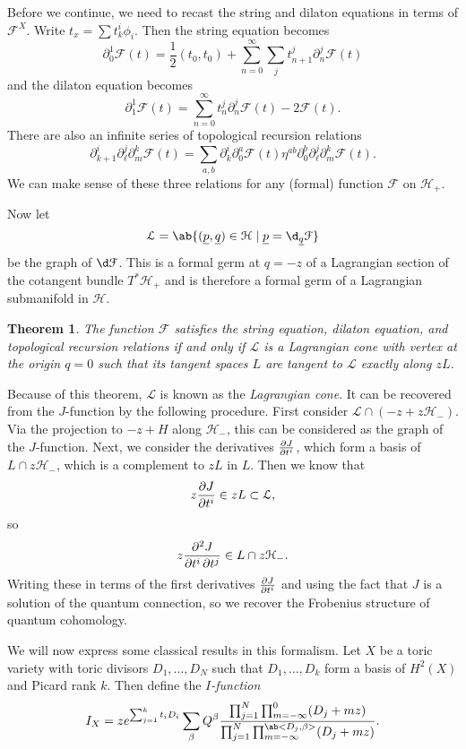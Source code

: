 \documentclass[leqno, openany]{memoir}
\newtheorem{thm}{Theorem}[section]
\theoremstyle{definition}
\theoremstyle{remark}
\theoremstyle{plain}
\theoremstyle{definition}
\theoremstyle{remark}
\newcommand{\mc}[1]{\mathcal{#1}}
\newcommand{\ul}[1]{\underline{#1}}
\begin{document}
Before we continue, we need to recast the string and dilaton equations in terms of $\mc{F}^X$. Write $t_x = \sum t_k^i \phi_i$. Then the string equation becomes
\[ \partial_0^1 \mc{F}(t) = \frac{1}{2} (t_0, t_0) + \sum_{n=0}^{\infty} \sum_{j} t_{n+1}^{j} \partial_n^{j} \mc{F}(t) \]
and the dilaton equation becomes
\[ \partial_1^1 \mc{F}(t) = \sum_{n=0}^{\infty} t_n^j \partial_n^j \mc{F}(t) - 2 \mc{F}(t). \]
There are also an infinite series of topological recursion relations
\[ \partial_{k+1}^i \partial_{\ell}^j \partial_{m}^k \mc{F}(t) = \sum_{a,b} \partial_k^i \partial_0^a \mc{F}(t) \eta^{ab} \partial_0^b \partial_{\ell}^j \partial_m^k \mc{F}(t). \]
We can make sense of these three relations for any (formal) function $\mc{F}$ on $\mc{H}_+$.

Now let
\[ \mc{L} = \ab\{(\ul{p}, \ul{q}) \in \mc{H} \mid \ul{p} = \d_{\ul{q}} \mc{F}\} \]
be the graph of $\d \mc{F}$. This is a formal germ at $q=-z$ of a Lagrangian section of the cotangent bundle $T^* \mc{H}_+$ and is therefore a formal germ of a Lagrangian submanifold in $\mc{H}$.

\begin{thm}\label{thm:overruled}
    The function $\mc{F}$ satisfies the string equation, dilaton equation, and topological recursion relations if and only if $\mc{L}$ is a Lagrangian cone with vertex at the origin $q=0$ such that its tangent spaces $L$ are tangent to $\mc{L}$ exactly along $z L$.
\end{thm}

Because of this theorem, $\mc{L}$ is known as the \textit{Lagrangian cone}. It can be recovered from the $J$-function by the following procedure. First consider $\mc{L} \cap (-z + z \mc{H}_-)$. Via the projection to $-z + H$ along $\mc{H}_-$, this can be considered as the graph of the $J$-function. Next, we consider the derivatives $\pdv{J}{t^i}$, which form a basis of $L \cap z \mc{H}_-$, which is a complement to $zL$ in $L$. Then we know that
\[ z \pdv{J}{t^i} \in z L \subset \mc{L}, \]
so 
\[ z \pdv{J}{t^i,t^j} \in L \cap z \mc{H}_-. \]
Writing these in terms of the first derivatives $\pdv{J}{t^i}$ and using the fact that $J$ is a solution of the quantum connection, so we recover the Frobenius structure of quantum cohomology.

We will now express some classical results in this formalism. Let $X$ be a toric variety with toric divisors $D_1, \ldots, D_N$ such that $D_1, \ldots, D_k$ form a basis of $H^2(X)$ and Picard rank $k$. Then define the \textit{$I$-function}
\[ I_X = z e^{\sum_{j=1}^k t_i D_i} \sum_{\beta} Q^{\beta} \frac{\prod_{j=1}^N \prod_{m=-\infty}^0 (D_j+mz)}{\prod_{j=1}^N \prod_{m=-\infty}^{\ab<D_j, \beta>}(D_j + mz)}. \]
\end{document}
